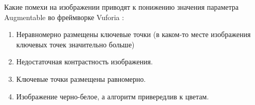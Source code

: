 
Какие помехи на изображении приводят к понижению значения параметра Augmentable во фреймворке Vuforia :

\begin{enumerate}
    \item Неравномерно размещены ключевые точки (в каком-то месте изображения ключевых точек значительно больше)
    \item Недостаточная контрастность изображения.
    \item Ключевые точки размещены равномерно.
    \item Изображение черно-белое, а алгоритм привередлив к цветам.
\end{enumerate}

